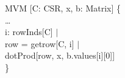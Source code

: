 \begin{myquote}
\Bpred MVM [C: CSR, x, b: Matrix] \{\\
\TA \ldots\\
\TA \Ball i: rowInds[C] $|$\\
\TB \Blet row = getrow[C, i] $|$\\
\TC dotProd[row, x, b.values[i][0]]\\
\}
\end{myquote}